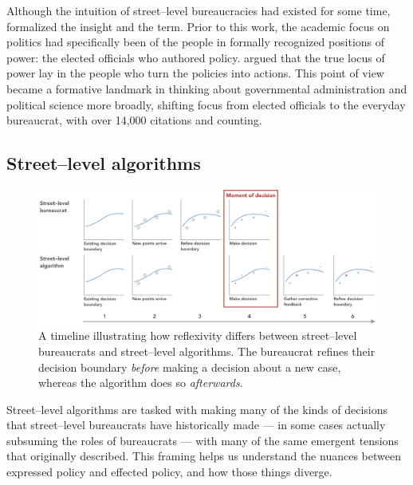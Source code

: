 \documentclass[street-level_algorithms]{subfiles}
\begin{document}
Although the intuition of street--level bureaucracies had existed for some time,
\citeauthor{lipsky1983street} formalized the insight and the term.
Prior to this work, the academic focus on politics had specifically been of the people in formally recognized positions of power:
the elected officials who authored policy.
\citeauthor{lipsky1983street} argued that the true locus of power lay in the people who turn the policies into actions.
This point of view became a formative landmark in thinking about governmental administration and political science more broadly,
shifting focus from elected officials to the everyday bureaucrat, with over 14,000 citations and counting.

\subsection{Street--level algorithms}
\begin{figure}[tb]
  \centering
  \includegraphics[width=\textwidth]{figures/Curves.png}
  \caption{A timeline illustrating how reflexivity differs between street--level bureaucrats and street--level algorithms.
  The bureaucrat refines their decision boundary \textit{before} making a decision about a new case, whereas the algorithm does so \textit{afterwards}.\vspace{1em}}
  \label{fig:curves}
\end{figure}

Street--level algorithms are tasked with making many of the kinds of decisions that
street--level bureaucrats have historically made
--- in some cases actually subsuming the roles of bureaucrats ---
with many of the same emergent tensions that \citeauthor{lipsky1983street} originally described.
This framing helps us understand the nuances between expressed policy and effected policy, and
how those things diverge.
\end{document}
